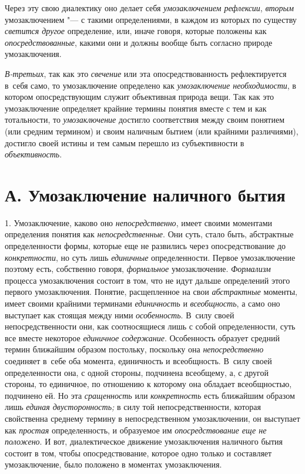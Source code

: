 Через эту свою диалектику оно делает себя
{\em умозаключением рефлексии},
{\em вторым}
умозаключением "--- с такими определениями, в
каждом из которых по существу
{\em светится другое}
определение, или, иначе говоря, которые положены как
{\em опосредствованные},
какими они и должны вообще быть согласно природе
умозаключения.

{\em В-третьих}, так как
это {\em свечение} или
эта опосредствованность рефлектируется в~себя само, то умозаключение
определено как {\em умозаключение
необходимости}, в котором опосредствующим служит объективная
природа вещи. Так как это умозаключение определяет крайние термины понятия
вместе с тем и как тотальности, то
{\em умозаключение}
достигло соответствия между своим понятием (или средним
термином) и своим наличным бытием (или крайними различиями), достигло своей
истины и тем самым перешло из субъективности в
{\em объективность}.

\section[А. Умозаключение наличного бытия]{А. Умозаключение наличного бытия}
1. Умозаключение, каково оно
{\em непосредственно},
имеет своими моментами определения понятия как
{\em непосредственные}.
Они суть, стало быть, абстрактные определенности формы,
которые еще не развились через опосредствование до
{\em конкретности}, но
суть лишь {\em единичные}
определенности. Первое умозаключение поэтому есть,
собственно говоря,
{\em формальное}
умозаключение.
{\em Формализм} процесса
умозаключения состоит в том, что не идут дальше определений этого первого
умозаключения. Понятие, расщепленное на свои
{\em абстрактные}
моменты, имеет своими крайними терминами
{\em единичность} и
{\em всеобщность}, а само
оно выступает как стоящая между ними
{\em особенность}. В~силу
своей непосредственности они, как соотносящиеся лишь с собой
определенности, суть все вместе некоторое
{\em единичное содержание}.
Особенность образует средний термин ближайшим образом
постольку, поскольку она
{\em непосредственно}
соединяет в~себе оба момента, единичность и всеобщность. В~силу своей
определенности она, с одной стороны, подчинена всеобщему, а, с
другой стороны, то единичное, по отношению к которому она обладает
всеобщностью, подчинено ей. Но эта {\em сращенность} или
{\em конкретность}
есть ближайшим образом лишь
{\em единая двусторонность;}
в силу той непосредственности, которая свойственна среднему
термину в непосредственном умозаключении, он выступает как
{\em простая}
определенность, и образуемое им
{\em опосредствование еще не положено}.
И вот, диалектическое движение умозаключения наличного бытия
состоит в том, чтобы опосредствование, которое одно только и составляет
умозаключение, было положено в моментах умозаключения.

